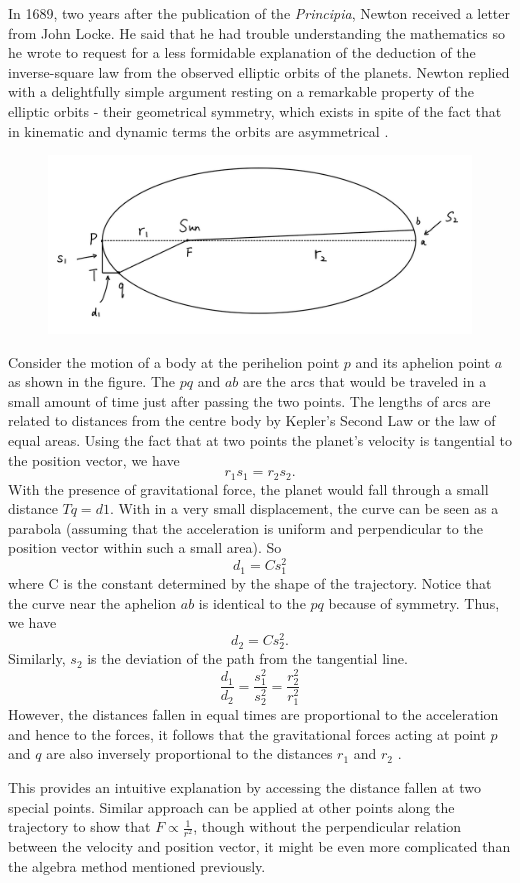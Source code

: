 \documentclass{article}
\begin{document}
In 1689, two years after the publication of the \textit{Principia}, Newton received a letter from John Locke. He said that he had trouble understanding the mathematics so he wrote to request for a less formidable explanation of the deduction of the inverse-square law from the observed elliptic orbits of the planets. Newton replied with a delightfully simple argument resting on a remarkable property of the elliptic orbits - their geometrical symmetry, which exists in spite of the fact that in kinematic and dynamic terms the orbits are asymmetrical \autocite{French1971}.

\begin{figure}[ht]
    \centering
    \includegraphics[width=0.5\linewidth]{images/IMG_6725.PNG}
    \label{fig:enter-label}
\end{figure}

Consider the motion of a body at the perihelion point $p$ and its aphelion point $a$ as shown in the figure. The $pq$ and $ab$ are the arcs that would be traveled in a small amount of time just after passing the two points. The lengths of arcs are related to distances from the centre body by Kepler's Second Law or the law of equal areas. Using the fact that at two points the planet's velocity is tangential to the position vector, we have
\[r_1 s_1 = r_2 s_2.\]
With the presence of gravitational force, the planet would fall through a small distance $Tq = d1$. With in a very small displacement, the curve can be seen as a parabola (assuming that the acceleration is uniform and perpendicular to the position vector within such a small area). So
\[d_1 = C s_1^2\]
where C is the constant determined by the shape of the trajectory. Notice that the curve near the aphelion $ab$ is identical to the $pq$ because of symmetry. Thus, we have
\[d_2 = C s_2^2.\]
Similarly, $s_2$ is the deviation of the path from the tangential line.
\[\frac{d_1}{d_2} = \frac{s_1^2}{s_2^2}= \frac{r_2^2}{r_1^2}\]
However, the distances fallen in equal times are proportional to the acceleration and hence to the forces, it follows that the gravitational forces acting at point $p$ and $q$ are also inversely proportional to the distances $r_1$ and $r_2$ \autocite{French1971}.

This provides an intuitive explanation by accessing the distance fallen at two special points. Similar approach can be applied at other points along the trajectory to show that $F \propto \frac{1}{r^2}$, though without the perpendicular relation between the velocity and position vector, it might be even more complicated than the algebra method mentioned previously.
\end{document}
